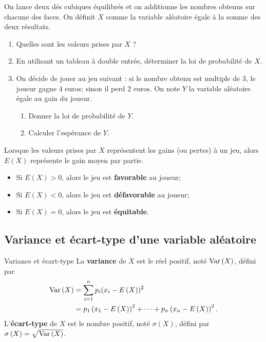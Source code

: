 \documentclass[11pt]{article}
\begin{document}
\begin{app}
  On lance deux dés cubiques équilibrés et on additionne les nombres obtenus sur
  chacune des faces. On définit $X$ comme la variable aléatoire égale à la somme
  des deux résultats.
  \begin{enumerate}
    \item Quelles sont les valeurs prises par $X$ ?
    \item En utilisant un tableau à double entrée, déterminer la loi de
      probabilité de $X$.
    \item On décide de jouer au jeu suivant : si le nombre obtenu est multiple
      de $3$, le joueur gagne $4$ euros; sinon il perd $2$ euros. On note $Y$ la
      variable aléatoire égale au gain du joueur.
      \begin{enumerate}
        \item Donner la loi de probabilité de $Y$.
        \item Calculer l'espérance de $Y$.
      \end{enumerate}
  \end{enumerate}
\end{app}

\begin{rmq}
  Lorsque les valeurs prises par $X$ représentent les gains (ou pertes) à un
  jeu, alors $E\left( X \right)$ représente le gain moyen par partie.
  \begin{itemize}
    \item Si $E\left( X \right)>0$, alors le jeu est \textbf{favorable} au
      joueur;
    \item Si $E\left( X \right)<0$, alors le jeu est \textbf{défavorable} au
      joueur;
    \item Si $E\left( X \right)=0$, alors le jeu est \textbf{équitable}.
  \end{itemize}
\end{rmq}

\subsection{Variance et écart-type d'une variable aléatoire}

\begin{defi}{Variance et écart-type}
  La \textbf{variance} de $X$ est le réel positif, noté $\operatorname{Var}\left( X
  \right)$, défini par
  \begin{align*}
    \operatorname{Var}\left( X \right) &= \sum_{i=1}^n p_i(x_i-E\left( X \right))^2 \\
    &= p_1\left(
    x_1-E\left( X \right) \right)^2+\cdots+p_n\left( x_n-E\left( X
    \right) \right)^2.
  \end{align*}
  L'\textbf{écart-type} de $X$ est le nombre positif, noté $\sigma\left( X
  \right)$, défini par $\sigma\left( X \right)=\sqrt{\operatorname{Var}\left( X \right)}$.
\end{defi}
\end{document}
